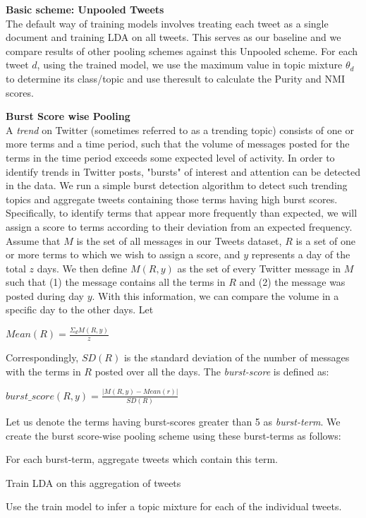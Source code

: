 \documentclass[10pt,a5paper,twoside]{article}
\begin{document}
\begin{compactenum}

\item \textbf{Basic scheme: Unpooled Tweets}
\\
The default way of training models involves treating each tweet as a single document and training LDA on all tweets. This serves as our baseline and we compare results of other pooling schemes against this Unpooled scheme. For each tweet $d$, using the trained model, we use the maximum value in topic mixture $\theta_{d} $ to determine its class/topic and use theresult to calculate the Purity and NMI scores.
\\

\item \textbf{ Burst Score wise Pooling}
\\
A \textit{trend} on Twitter (sometimes referred to as a trending topic) consists of one or more terms and a time period, such that the volume of messages posted for the terms in the time period exceeds some expected level of activity. In order to identify trends in Twitter posts, "bursts" of interest and attention can be detected in the data. We run a simple burst detection algorithm to detect such trending topics and aggregate tweets containing those terms having high burst scores.
\\
Specifically, to identify terms that appear more frequently than expected, we will assign a score to terms according to their deviation from an expected frequency. Assume that $M$ is the set of all messages in our Tweets dataset, $R$ is a set of one or more terms to which we wish to assign a score, and $y$ represents a day of the total $z$ days. We then define $M(R, y)$ as the set of every Twitter message in $M$ such that (1) the message contains all the terms in $R$ and (2) the message was posted during day $y$. With this information, we can compare the volume in a specific day to the other days. Let 

\begin{center}
$ Mean(R) = \frac{\Sigma_d M(R,y)}{z} $
\end{center}

Correspondingly, $ SD(R) $ is the standard deviation of the number of messages with the terms in $R$ posted over all the days. The \textit{burst-score} is defined as:
\begin{center}
$ burst\_score(R,y) = \frac{|M(R,y) - Mean(r)|}{SD(R)} $
\end{center}

Let us denote the terms having burst-scores greater than 5 as \textit{burst-term}. We create the burst score-wise pooling scheme using these burst-terms as follows:
\begin{compactitem}
\item For each burst-term, aggregate tweets which contain this term.
\item Train LDA on this aggregation of tweets
\item Use the train model to infer a topic mixture for each of the individual tweets.
\end{compactitem}


\end{compactenum}
\end{document}
